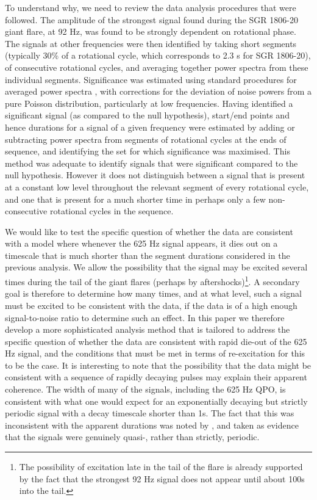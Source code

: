 \documentclass{emulateapj}
\begin{document}
To understand why, we need to review the data analysis procedures that were followed. The amplitude of the strongest signal found during the SGR 1806-20 giant flare, at 92 Hz, was found to be strongly dependent on rotational phase. The signals at other frequencies were then identified by taking short segments (typically 30\% of a rotational cycle, which corresponds to 2.3 s for SGR 1806-20), of consecutive rotational cycles, and averaging together power spectra from these individual segments. Significance was estimated using standard procedures for averaged power spectra \citep{vanderKlis89}, with corrections for the deviation of noise powers from a pure Poisson distribution, particularly at low frequencies. Having identified a significant signal (as compared to the null hypothesis), start/end points and hence durations for a signal of a given frequency were estimated by adding or subtracting power spectra from segments of rotational cycles at the ends of sequence, and identifying the set for which significance was maximised. This method was adequate to identify signals that were significant compared to the null hypothesis. However it does not distinguish between a signal that is present at a constant low level throughout the relevant segment of every rotational cycle, and one that is present for a much shorter time in perhaps only a few non-consecutive rotational cycles in the sequence.

We would like to test the specific question of whether the data are consistent with a model where whenever the 625 Hz signal appears, it dies out on a timescale that is much shorter than the segment durations considered in the previous analysis. We allow the possibility that the signal may be excited several times during the tail of the giant flares (perhaps by aftershocks)\footnote{The possibility of excitation late in the tail of the flare is already supported by the fact that the strongest 92 Hz signal does not appear until about 100s into the tail.}. A secondary goal is therefore to determine how many times, and at what level, such a signal must be excited to be consistent with the data, if the data is of a high enough signal-to-noise ratio to determine such an effect. In this paper we therefore develop a more sophisticated analysis method that is tailored to address the specific question of whether the data are consistent with rapid die-out of the 625 Hz signal, and the conditions that must be met in terms of re-excitation for this to be the case. It is interesting to note that the possibility that the data might be consistent with a sequence of rapidly decaying pulses may explain their apparent coherence. The width of many of the signals, including the 625 Hz QPO, is consistent with what one would expect for an exponentially decaying but strictly periodic signal with a decay timescale shorter than 1s. The fact that this was inconsistent with the apparent durations was noted by \citet{Watts11}, and taken as evidence that the signals were genuinely quasi-, rather than strictly, periodic.
\end{document}
